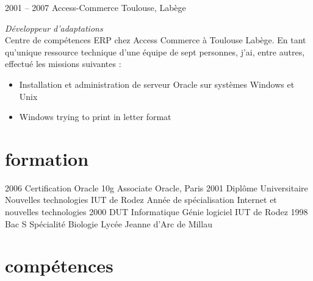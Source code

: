 \documentclass{friggeri-cv} 	%
\begin{document}
\begin{entrylist}
\entry
{2001 -- 2007}
{Access-Commerce}
{Toulouse, Labège}
{\vspace{0.2cm}\emph{Développeur d'adaptations}  \\
Centre de compétences ERP chez Access Commerce à Toulouse Labège.
En tant qu’unique ressource technique d'une équipe de sept personnes, j’ai, entre autres, effectué les
missions suivantes :
\begin{itemize}
\item Installation et administration de serveur Oracle sur systèmes Windows et Unix
\item Windows trying to print in letter format
\end{itemize}
}
\end{entrylist}
\newpage


\section{formation}

\begin{entrylist}
\entry
{2006}
{Certification Oracle {\normalfont 10g Associate}}
{Oracle, Paris}
{}
\entry
{2001}
{Diplôme Universitaire {\normalfont Nouvelles technologies}}
{IUT de Rodez}
{Année de spécialisation Internet et nouvelles technologies}
\entry
{2000}
{DUT {\normalfont Informatique Génie logiciel}}
{IUT de Rodez}
{}
\entry
{1998}
{Bac S {\normalfont Spécialité Biologie}}
{Lycée Jeanne d'Arc de Millau}
{}
\end{entrylist}


\section{compétences}
\end{document}
